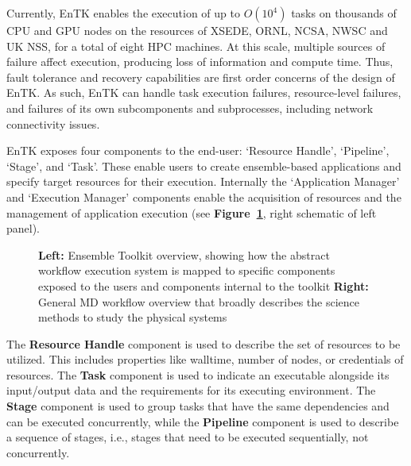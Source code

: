 Currently, EnTK enables the execution of up to \(O(10^4)\) tasks on thousands
of CPU and GPU nodes on the resources of XSEDE, ORNL, NCSA, NWSC and UK NSS,
for a total of eight HPC machines. At this scale, multiple sources of failure
affect execution, producing loss of information and compute time. Thus, fault
tolerance and recovery capabilities are first order concerns of the design of
EnTK\@. As such, EnTK can handle task execution failures, resource-level
failures, and failures of its own subcomponents and subprocesses, including
network connectivity issues.

EnTK exposes four components to the end-user: `Resource Handle', `Pipeline',
`Stage', and `Task'. These enable users to create ensemble-based applications
and specify target resources for their execution. Internally the `Application
Manager' and `Execution Manager' components enable the acquisition of
resources and the management of application execution (see
\textbf{Figure~\ref{fig:entk_arch}}, right schematic of left panel).

\begin{figure}[!htbp]
  \centering
  \begin{minipage}[b]{0.55\textwidth}
  \centering
  \end{minipage}
  \begin{minipage}[b]{0.44\textwidth}
  \centering
  \end{minipage}
  \caption{\textbf{Left:} Ensemble Toolkit overview, showing how the abstract
  workflow execution system is mapped to specific components exposed to the
  users and components internal to the toolkit \textbf{Right:} General MD
  workflow overview that broadly describes the science methods to study the
  physical systems}\label{fig:entk_arch}
\end{figure}

The \textbf{Resource Handle} component is used to describe the set of
resources to be utilized. This includes properties like walltime, number of
nodes, or credentials of resources. The \textbf{Task} component is used to
indicate an executable alongside its input/output data and the requirements
for its executing environment. The \textbf{Stage} component is used to group
tasks that have the same dependencies and can be executed concurrently, while
the \textbf{Pipeline} component is used to describe a sequence of stages,
i.e., stages that need to be executed sequentially, not concurrently.

